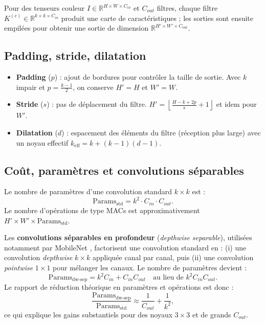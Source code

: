 Pour des tenseurs couleur $I \in \mathbb{R}^{H\times W\times C_{in}}$ et $C_{out}$ filtres, chaque filtre $K^{(c)} \in \mathbb{R}^{k\times k\times C_{in}}$ produit une carte de caractéristiques ; les sorties sont ensuite empilées pour obtenir une sortie de dimension $\mathbb{R}^{H'\times W'\times C_{out}}$.

\subsection{Padding, stride, dilatation}
\begin{itemize}
    \item \textbf{Padding} ($p$) : ajout de bordures pour contrôler la taille de sortie. Avec $k$ impair et $p=\tfrac{k-1}{2}$, on conserve $H'=H$ et $W'=W$.
    \item \textbf{Stride} ($s$) : pas de déplacement du filtre. $H' = \left\lfloor \tfrac{H - k + 2p}{s} + 1 \right\rfloor$ et idem pour $W'$.
    \item \textbf{Dilatation} ($d$) : espacement des éléments du filtre (réception plus large) avec un noyau effectif $k_{\mathrm{eff}} = k + (k-1)(d-1)$.
\end{itemize}

\subsection{Coût, paramètres et convolutions séparables}
Le nombre de paramètres d’une convolution standard $k \times k$ est :
\begin{equation}
    \mathrm{Params}_{\text{std}} = k^2 \cdot C_{in} \cdot C_{out}.
\end{equation}
Le nombre d’opérations de type MACs est approximativement $H' \times W' \times \mathrm{Params}_{\text{std}}$.

Les \textbf{convolutions séparables en profondeur} (\emph{depthwise separable}), utilisées notamment par MobileNet \cite{howard2017mobilenets}, factorisent une convolution standard en : (i) une convolution \emph{depthwise} $k \times k$ appliquée canal par canal, puis (ii) une convolution \emph{pointwise} $1 \times 1$ pour mélanger les canaux. Le nombre de paramètres devient :
\begin{equation}
    \mathrm{Params}_{\text{dw-sep}} = k^2 C_{in} + C_{in} C_{out} \quad \text{au lieu de } k^2 C_{in} C_{out}.
\end{equation}
Le rapport de réduction théorique en paramètres et opérations est donc :
\begin{equation}
    \frac{\mathrm{Params}_{\text{dw-sep}}}{\mathrm{Params}_{\text{std}}} \approx \frac{1}{C_{out}} + \frac{1}{k^2},
\end{equation}
ce qui explique les gains substantiels pour des noyaux $3 \times 3$ et de grands $C_{out}$.

